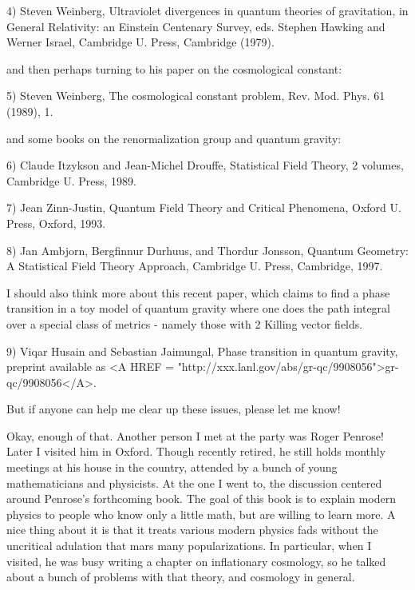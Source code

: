 4) Steven Weinberg, Ultraviolet divergences in quantum theories of
gravitation, in General Relativity: an Einstein Centenary Survey, 
eds. Stephen Hawking and Werner Israel, Cambridge U. Press, Cambridge
(1979).

and then perhaps turning to his paper on the cosmological constant:

5) Steven Weinberg, The cosmological constant problem, Rev. Mod. Phys.
61 (1989), 1.  

and some books on the renormalization group and quantum gravity:

6) Claude Itzykson and Jean-Michel Drouffe, Statistical Field Theory,
2 volumes, Cambridge U. Press, 1989.

7) Jean Zinn-Justin, Quantum Field Theory and Critical Phenomena,
Oxford U. Press, Oxford, 1993.

8) Jan Ambjorn, Bergfinnur Durhuus, and Thordur Jonsson, Quantum 
Geometry: A Statistical Field Theory Approach, Cambridge U. Press, 
Cambridge, 1997.

I should also think more about this recent paper, which claims to
find a phase transition in a toy model of quantum gravity where
one does the path integral over a special class of metrics - namely 
those with 2 Killing vector fields.

9) Viqar Husain and Sebastian Jaimungal, Phase transition in 
quantum gravity, preprint available as <A HREF = "http://xxx.lanl.gov/abs/gr-qc/9908056">gr-qc/9908056</A>.

But if anyone can help me clear up these issues, please let me know!

Okay, enough of that.  Another person I met at the party was Roger
Penrose!  Later I visited him in Oxford.  Though recently retired,
he still holds monthly meetings at his house in the country, attended
by a bunch of young mathematicians and physicists.  At the one I went
to, the discussion centered around Penrose's forthcoming book.  The goal 
of this book is to explain modern physics to people who know only a 
little math, but are willing to learn more.  A nice thing about it is
that it treats various modern physics fads without the uncritical 
adulation that mars many popularizations.  In particular, when I 
visited, he was busy writing a chapter on inflationary cosmology, 
so he talked about a bunch of problems with that theory, and cosmology
in general.  

